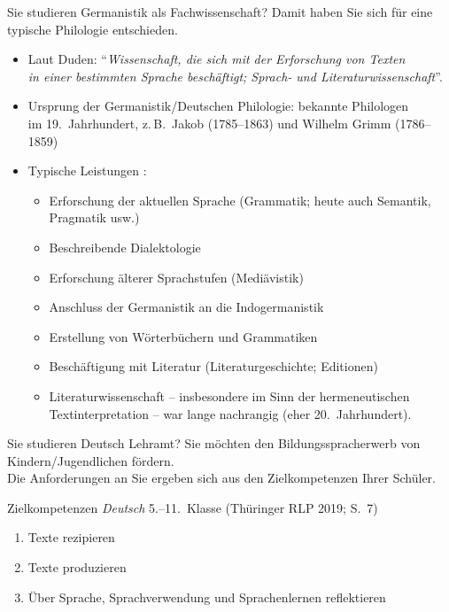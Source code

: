 \begin{frame}
  {Sie studieren Germanistik als Fachwissenschaft?}
  \onslide<+->
  \onslide<+->
  Damit haben Sie sich für eine typische \alert{Philologie} entschieden.\\
  \Zeile
  \begin{itemize}[<+->]
    \item Laut Duden: \alert{"`\textit{Wissenschaft, die sich mit der Erforschung von Texten\\
      in einer bestimmten Sprache beschäftigt; Sprach- und Literaturwissenschaft}"'}.
      \Halbzeile
    \item Ursprung der Germanistik\slash Deutschen Philologie: bekannte Philologen\\
      im 19.~Jahrhundert, z.\,B.\ Jakob (1785--1863) und Wilhelm Grimm (1786--1859)
    \Halbzeile
  \item Typische Leistungen :
      \begin{itemize}[<+->]
        \item Erforschung der aktuellen Sprache (Grammatik; heute auch Semantik, Pragmatik usw.)
        \item Beschreibende Dialektologie
        \item Erforschung älterer Sprachstufen (Mediävistik)
        \item Anschluss der Germanistik an die Indogermanistik
        \item Erstellung von Wörterbüchern und Grammatiken
        \item Beschäftigung mit Literatur (Literaturgeschichte; Editionen)
        \item Literaturwissenschaft -- insbesondere im Sinn der hermeneutischen \\
          Textinterpretation -- war lange nachrangig (eher 20.~Jahrhundert).
      \end{itemize}
  \end{itemize}
\end{frame}

\begin{frame}
  {Sie studieren Deutsch Lehramt?}
  \onslide<+->
  \onslide<+->
  Sie möchten den \alert{Bildungsspracherwerb} von Kindern\slash Jugendlichen fördern.\\
  Die Anforderungen an Sie ergeben sich aus den \alert{Zielkompetenzen Ihrer Schüler}.\\
  \onslide<+->
  \Zeile
  \begin{block}
    {Zielkompetenzen \textit{Deutsch} 5.--11.~Klasse (Thüringer RLP 2019; S.~7)}
    \begin{enumerate}[<+->]
      \item Texte rezipieren
      \item Texte produzieren
      \item \alert{Über Sprache, Sprachverwendung und Sprachenlernen reflektieren}
    \end{enumerate}
  \end{block}
\end{frame}

